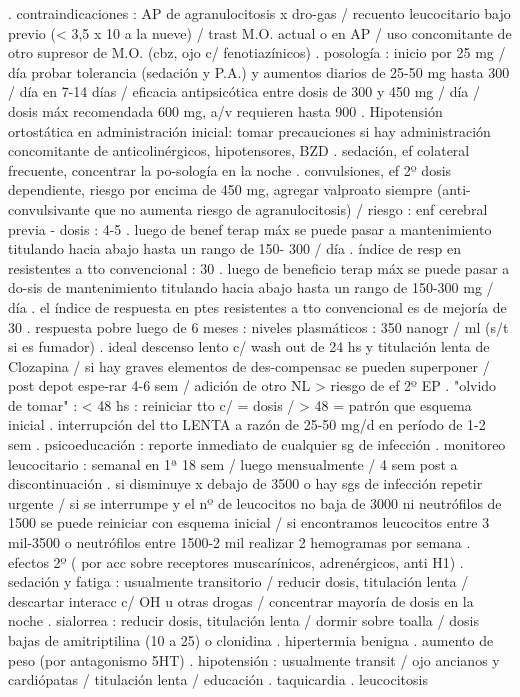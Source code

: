 \documentclass{scrbook}
\begin{document}
. contraindicaciones : AP de agranulocitosis x dro-gas / recuento leucocitario bajo previo (< 3,5 x 10 a la nueve) / trast M.O. actual o en AP / uso concomitante de otro supresor de M.O. (cbz, ojo c/ fenotiazínicos)
. posología : inicio por 25 mg / día probar tolerancia (sedación y P.A.) y aumentos diarios de 25-50 mg hasta 300 / día en 7-14 días / eficacia antipsicótica entre dosis de 300 y 450 mg / día / dosis máx recomendada 600 mg, a/v requieren hasta 900
. Hipotensión ortostática en administración inicial: tomar precauciones si hay administración concomitante de anticolinérgicos, hipotensores, BZD
. sedación, ef colateral frecuente, concentrar la po-sología en la noche
. convulsiones, ef 2º dosis dependiente, riesgo por encima de 450 mg, agregar valproato siempre (anti-convulsivante que no aumenta riesgo de agranulocitosis) / riesgo : enf cerebral previa - dosis : 4-5 %
. luego de benef terap máx se puede pasar a mantenimiento titulando hacia abajo hasta un rango de 150- 300 / día
. índice de resp en resistentes a tto convencional : 30%
. luego de beneficio terap máx se puede pasar a do-sis de mantenimiento titulando hacia abajo hasta un rango de 150-300 mg / día
. el índice de respuesta en ptes resistentes a tto convencional es de mejoría de 30 %
. respuesta pobre luego de 6 meses : niveles plasmáticos : 350 nanogr / ml (s/t si es fumador)
. ideal descenso lento c/ wash out de 24 hs y titulación lenta de Clozapina / si hay graves elementos de des-compensac se pueden superponer / post depot espe-rar 4-6 sem / adición de otro NL > riesgo de ef 2º EP
. "olvido de tomar" : < 48 hs : reiniciar tto c/ = dosis / > 48 = patrón que esquema inicial
. interrupción del tto LENTA a razón de 25-50 mg/d en período de 1-2 sem
. psicoeducación : reporte inmediato de cualquier sg de infección
. monitoreo leucocitario : semanal en 1ª 18 sem / luego mensualmente / 4 sem post a discontinuación
. si disminuye x debajo de 3500 o hay sgs de infección repetir urgente / si se interrumpe y el nº de leucocitos no baja de 3000 ni neutrófilos de 1500 se puede reiniciar con esquema inicial / si encontramos leucocitos entre 3 mil-3500 o neutrófilos entre 1500-2 mil realizar 2 hemogramas por semana
. efectos 2º ( por acc sobre receptores muscarínicos, adrenérgicos, anti H1)
. sedación y fatiga : usualmente transitorio / reducir dosis, titulación lenta / descartar interacc c/ OH u otras drogas / concentrar mayoría de dosis en la noche
. sialorrea : reducir dosis, titulación lenta / dormir sobre toalla / dosis bajas de amitriptilina (10 a 25) o clonidina
. hipertermia benigna
. aumento de peso (por antagonismo 5HT)
. hipotensión : usualmente transit / ojo ancianos y cardiópatas / titulación lenta / educación
. taquicardia
. leucocitosis
\end{document}
